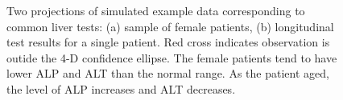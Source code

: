 \documentclass[
  12pt]{article}
\begin{document}
\begin{figure}

\begin{minipage}{0.50\linewidth}



\end{minipage}%
%
\begin{minipage}{0.50\linewidth}



\end{minipage}%

\caption{\label{fig-liver}Two projections of simulated example data
corresponding to common liver tests: (a) sample of female patients, (b)
longitudinal test results for a single patient. Red cross indicates
observation is outide the 4-D confidence ellipse. The female patients
tend to have lower ALP and ALT than the normal range. As the patient
aged, the level of ALP increases and ALT decreases.}

\end{figure}%
\end{document}
